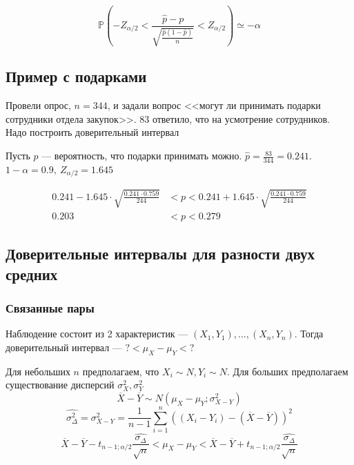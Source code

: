 \documentclass[a4paper, 10pt]{article}
\begin{document}
\begin{equation*}
    \mathbb{P}\left(-Z_{\alpha/2}<\frac{\widehat{p}-p}{\sqrt{\frac{\widehat{p}(1-\widehat{p})}{n}}}<Z_{\alpha/2}\right)\simeq-\alpha
\end{equation*}

\subsection{Пример с подарками}
Провели опрос, $n=344$, и задали вопрос <<могут ли принимать подарки сотрудники отдела закупок>>. 83 ответило, что на усмотрение сотрудников. Надо построить доверительный интервал

Пусть $p$ — вероятность, что подарки принимать можно. $\widehat{p}=\displaystyle\frac{83}{344}=0.241$. $1-\alpha=0.9,\ Z_{\alpha/2}=1.645$

\begin{equation*}
    \begin{aligned}
        0.241-1.645\cdot\sqrt{\frac{0.241\cdot0.759}{244}}&<p<0.241+1.645\cdot\sqrt{\frac{0.241\cdot0.759}{244}}\\
        0.203&<p<0.279
    \end{aligned}
\end{equation*}


\subsection{Доверительные интервалы для разности двух средних}
\subsubsection{Связанные пары}
Наблюдение состоит из 2 характеристик — $(X_1,Y_1),\ldots,(X_n,Y_n)$. Тогда доверительный интервал — $?<\mu_X-\mu_Y<?$

Для небольших $n$ предполагаем, что $X_i\sim N,Y_i\sim N$. Для больших предполагаем существование дисперсий $\sigma^2_X,\sigma^2_Y$
\begin{equation*}
    \overline{X}-\overline{Y}\sim N(\mu_X-\mu_Y;\sigma^2_{X-Y})
\end{equation*}
\begin{equation*}
    \widehat{\sigma^2_{\Delta}}=\widehat{\sigma^2_{X-Y}}=\frac{1}{n-1}\sum_{i=1}^n\left(\left(X_i-Y_i\right)-\left(\overline{X}-\overline{Y}\right)\right)^2
\end{equation*}
\begin{equation*}
    \overline{X}-\overline{Y}-t_{n-1;\alpha/2}\frac{\widehat{\sigma_{\Delta}}}{\sqrt{n}}<\mu_X-\mu_Y<\overline{X}-\overline{Y}+t_{n-1;\alpha/2}\frac{\widehat{\sigma_{\Delta}}}{\sqrt{n}}
\end{equation*}
\end{document}
